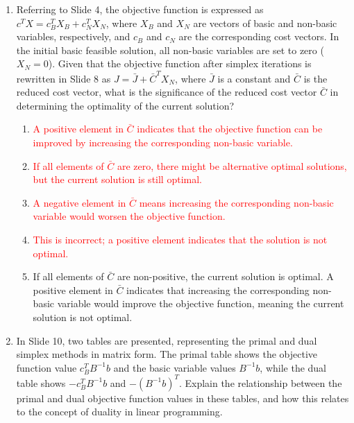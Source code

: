 \documentclass{article}%
\newcommand{\incorrect}[1]{\textcolor{red}{#1}}
\begin{document}
\begin{enumerate}
\begin{enumerate}
\item \incorrect{This is incorrect; the number of rows is $m$, not $m+n$.}%
\item \incorrect{This is incorrect; the number of rows is $m$, not $n$.}%
\end{enumerate}%
\vspace{1em}%
\item Referring to Slide 4, the objective function is expressed as $c^T X = c_B^T X_B + c_N^T X_N$, where $X_B$ and $X_N$ are vectors of basic and non-basic variables, respectively, and $c_B$ and $c_N$ are the corresponding cost vectors.  In the initial basic feasible solution, all non-basic variables are set to zero ($X_N = 0$).  Given that the objective function after simplex iterations is rewritten in Slide 8 as $J = \bar{J} + \bar{C}^T X_N$, where $\bar{J}$ is a constant and $\bar{C}$ is the reduced cost vector, what is the significance of the reduced cost vector $\bar{C}$ in determining the optimality of the current solution?%
\begin{enumerate}%
\item \incorrect{A positive element in $\bar{C}$ indicates that the objective function can be improved by increasing the corresponding non-basic variable.}%
\item \incorrect{If all elements of $\bar{C}$ are zero, there might be alternative optimal solutions, but the current solution is still optimal.}%
\item \incorrect{A negative element in $\bar{C}$ means increasing the corresponding non-basic variable would worsen the objective function.}%
\item \incorrect{This is incorrect; a positive element indicates that the solution is not optimal.}%
\item If all elements of $\bar{C}$ are non-positive, the current solution is optimal.  A positive element in $\bar{C}$ indicates that increasing the corresponding non-basic variable would improve the objective function, meaning the current solution is not optimal.%
\end{enumerate}%
\vspace{1em}%
\item In Slide 10, two tables are presented, representing the primal and dual simplex methods in matrix form. The primal table shows the objective function value $c_B^T B^{-1} b$ and the basic variable values $B^{-1} b$, while the dual table shows $-c_B^T B^{-1} b$ and $-(B^{-1}b)^T$.  Explain the relationship between the primal and dual objective function values in these tables, and how this relates to the concept of duality in linear programming.%

\end{enumerate}
\end{document}
